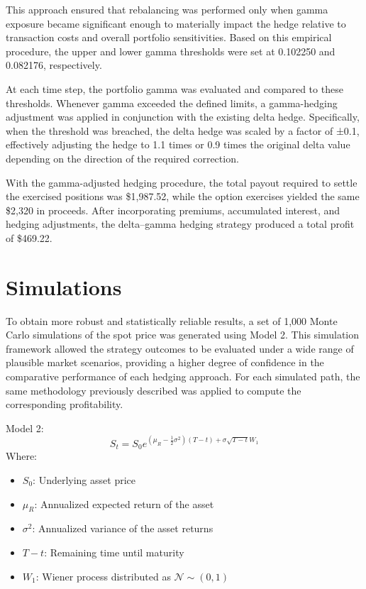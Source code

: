 \documentclass{article}
\begin{document}
This approach ensured that rebalancing was performed only when gamma exposure became significant enough to materially impact the hedge relative to transaction costs and overall portfolio sensitivities. Based on this empirical procedure, the upper and lower gamma thresholds were set at 0.102250 and 0.082176, respectively.

At each time step, the portfolio gamma was evaluated and compared to these thresholds. Whenever gamma exceeded the defined limits, a gamma-hedging adjustment was applied in conjunction with the existing delta hedge. Specifically, when the threshold was breached, the delta hedge was scaled by a factor of ±0.1, effectively adjusting the hedge to 1.1 times or 0.9 times the original delta value depending on the direction of the required correction.

With the gamma-adjusted hedging procedure, the total payout required to settle the exercised positions was \$1,987.52, while the option exercises yielded the same \$2,320 in proceeds. After incorporating premiums, accumulated interest, and hedging adjustments, the delta–gamma hedging strategy produced a total profit of \$469.22.

\newpage

\section{Simulations}

To obtain more robust and statistically reliable results, a set of 1,000 Monte Carlo simulations of the spot price was generated using Model 2. This simulation framework allowed the strategy outcomes to be evaluated under a wide range of plausible market scenarios, providing a higher degree of confidence in the comparative performance of each hedging approach. For each simulated path, the same methodology previously described was applied to compute the corresponding profitability.

Model 2:
$$
S_t = S_0 e^{\left(\mu_R - \frac{1}{2}\sigma^2 \right)(T-t)+\sigma \sqrt{T-t}W_1}
$$
Where:

\begin{itemize}
    \item $S_0$: Underlying asset price
    \item $\mu_R$: Annualized expected return of the asset
    \item $\sigma^2$: Annualized variance of the asset returns
    \item $T-t$: Remaining time until maturity
    \item $W_1$: Wiener process distributed as $\mathcal{N} \sim (0,1)$
\end{itemize}
\end{document}
